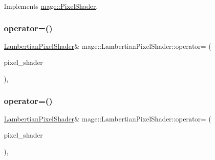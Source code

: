 Implements \hyperlink{classmage_1_1_pixel_shader_ac7662093a83213881698dca25f8215a2}{mage\+::\+Pixel\+Shader}.

\hypertarget{classmage_1_1_lambertian_pixel_shader_a03ae64ef13e62b33c6b6ac306207a045}{}\label{classmage_1_1_lambertian_pixel_shader_a03ae64ef13e62b33c6b6ac306207a045} 
\subsubsection{\texorpdfstring{operator=()}{operator=()}\hspace{0.1cm}{\footnotesize\ttfamily [1/2]}}
{\footnotesize\ttfamily \hyperlink{classmage_1_1_lambertian_pixel_shader}{Lambertian\+Pixel\+Shader}\& mage\+::\+Lambertian\+Pixel\+Shader\+::operator= (\begin{DoxyParamCaption}\item[{const \hyperlink{classmage_1_1_lambertian_pixel_shader}{Lambertian\+Pixel\+Shader} \&}]{pixel\+\_\+shader }\end{DoxyParamCaption})\hspace{0.3cm}{\ttfamily [private]}, {\ttfamily [delete]}}

\hypertarget{classmage_1_1_lambertian_pixel_shader_af3fd77b32ff54a932b9c8734446cd5bd}{}\label{classmage_1_1_lambertian_pixel_shader_af3fd77b32ff54a932b9c8734446cd5bd} 
\subsubsection{\texorpdfstring{operator=()}{operator=()}\hspace{0.1cm}{\footnotesize\ttfamily [2/2]}}
{\footnotesize\ttfamily \hyperlink{classmage_1_1_lambertian_pixel_shader}{Lambertian\+Pixel\+Shader}\& mage\+::\+Lambertian\+Pixel\+Shader\+::operator= (\begin{DoxyParamCaption}\item[{\hyperlink{classmage_1_1_lambertian_pixel_shader}{Lambertian\+Pixel\+Shader} \&\&}]{pixel\+\_\+shader }\end{DoxyParamCaption})\hspace{0.3cm}{\ttfamily [private]}, {\ttfamily [delete]}}



